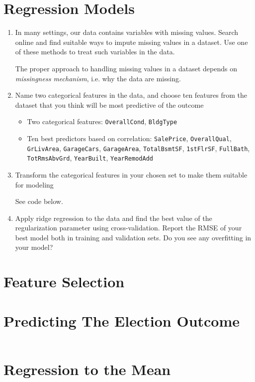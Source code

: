\documentclass{article}
\begin{document}
\section{Regression Models}
\begin{enumerate}[label={(\alph*)}]
    \item In many settings, our data contains variables with missing values.
    Search online and find suitable ways to impute missing values in a
    dataset. Use one of these methods to treat such variables in the data.
    
    The proper approach to handling missing values in a dataset depends on 
    \textit{missingness mechanism}, i.e. why the data are missing. 
    \item Name two categorical features in the data, and choose ten features from
    the dataset that you think will be most predictive of the outcome
    \begin{itemize}
        \item Two categorical features: \texttt{OverallCond}, \texttt{BldgType}
        \item Ten best predictors based on correlation: \texttt{SalePrice}, 
        \texttt{OverallQual}, \texttt{GrLivArea}, \texttt{GarageCars}, 
        \texttt{GarageArea}, \texttt{TotalBsmtSF}, \texttt{1stFlrSF},
        \texttt{FullBath}, \texttt{TotRmsAbvGrd}, \texttt{YearBuilt}, 
        \texttt{YearRemodAdd}
    \end{itemize}
    
    \item Transform the categorical features in your chosen set to make them
    suitable for modeling
    
    See code below.
    
    \item Apply ridge regression to the data and find the best value of the 
    regularization parameter using cross-validation. Report the RMSE of your best 
    model both in training and validation sets. Do you see any overfitting in your 
    model?


\end{enumerate}
\pagebreak

\section{Feature Selection}
\pagebreak

\section{Predicting The Election Outcome}
\begin{lstlisting}[language=Python, caption=Code for Question 1 \emph{Hypothesis
Testing}]

\end{lstlisting}

\pagebreak

\section{Regression to the Mean}

%
%
\end{document}
